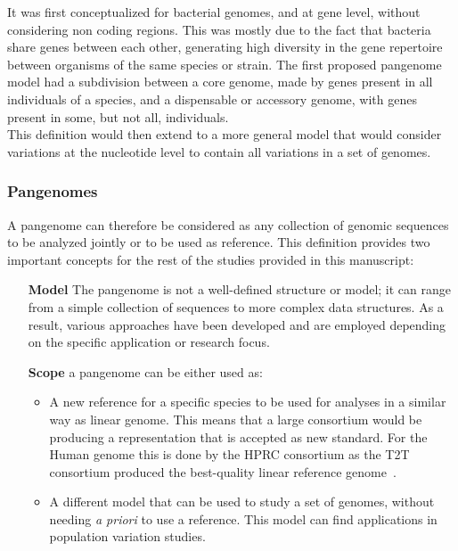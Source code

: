It was first conceptualized for bacterial genomes, and at gene level, without considering non coding regions. This was mostly due to the fact that bacteria share genes between each other, generating high diversity in the gene repertoire between organisms of the same species or strain.
The first proposed pangenome model had a subdivision between a core genome, made by genes present in all individuals of a species, and a dispensable or accessory genome, with genes present in some, but not all, individuals.\\
This definition would then extend to a more general model that would consider variations at the nucleotide level to contain all variations in a set of genomes.\\
\subsubsection{Pangenomes}
A pangenome can therefore be considered as any collection of genomic sequences to be analyzed jointly or to be used as reference. This definition provides two important concepts for the rest of the studies provided in this manuscript: 
\begin{itemize}
	\item[\textbf{Model}] The pangenome is not a well-defined structure or model; it can range from a simple collection of sequences to more complex data structures. As a result, various approaches have been developed and are employed depending on the specific application or research focus.
	\item[\textbf{Scope}] a pangenome can be either used as:
	\begin{itemize}
		\item A new reference for a specific species to be used for analyses in a similar way as linear genome. This means that a large consortium would be producing a representation that is accepted as new standard. For the Human genome this is done by the HPRC consortium as the T2T consortium produced the best-quality linear reference genome~\cite{t2t}.
		\item A different model that can be used to study a set of genomes, without needing \emph{a priori} to use a reference. This model can find applications in population variation studies. 
	\end{itemize} 
\end{itemize}
